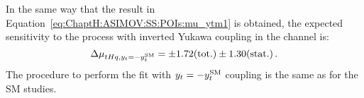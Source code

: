 In the same way that the result in Equation~\ref{eq:ChaptH:ASIMOV:SS:POIs:mu_ytm1} is obtained, the
expected sensitivity to the \tHq process with inverted Yukawa coupling in the \dilepSStau channel is:
\begin{equation*}
	\Delta \mu_{tHq, y_{t}=-y_{t}^{\text{SM}}} = \pm 1.72 (\text{tot.}) \pm 1.30 (\text{stat.}) \label{eq:ChaptH:ASIMOV:SS:POIs:mu_ytm1} \,.
\end{equation*}
The procedure to perform the fit with $y_{t}=-y_{t}^{\text{SM}}$ coupling is the same as for the SM studies.




\FloatBarrier 

